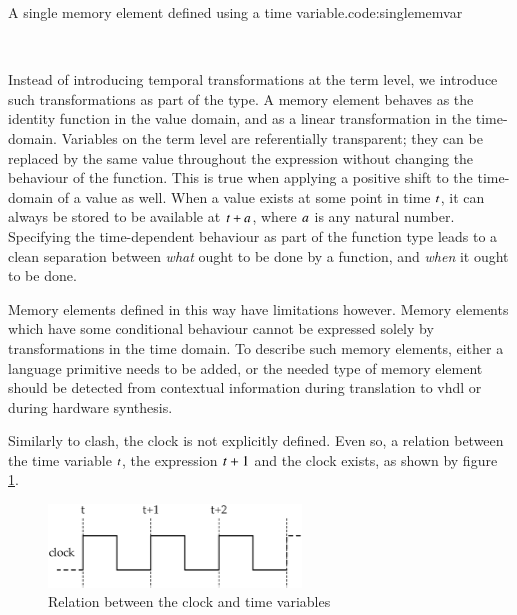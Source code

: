 \begin{texexptitled}{A single memory element defined using a time variable.}{code:singlememvar}\begin{hscode}\SaveRestoreHook
{}%
%
%
\>[3]{}\mathbin{::}\langle{}\rangle\to {}\langle{}\mathbin{+}\rangle{}\<[E]%
\\
\>[3]{}\;\mathrel{=}\<[E]%
\ColumnHook
\end{hscode}\resethooks
\end{texexptitled}

Instead of introducing temporal transformations at the term level, we introduce such transformations as part of the type. 
A memory element behaves as the identity function in the value domain, and as a linear transformation in the time-domain.
Variables on the term level are referentially transparent; they can be replaced by the same value throughout the expression without changing the behaviour of the function.
This is true when applying a positive shift to the time-domain of a value as well.
When a value exists at some point in time \ensuremath{\Varid{t}}, it can always be stored to be available at \ensuremath{\Varid{t}\mathbin{+}\Varid{a}}, where \ensuremath{\Varid{a}} is any natural number.
Specifying the time-dependent behaviour as part of the function type leads to a clean separation between \textit{what} ought to be done by a function, and \textit{when} it ought to be done.

Memory elements defined in this way have limitations however.
Memory elements which have some conditional behaviour cannot be expressed solely by transformations in the time domain.
To describe such memory elements, either a language primitive needs to be added, or the needed type of memory element should be detected from contextual information during translation to \gls{vhdl} or during hardware synthesis.

Similarly to \gls{clash}, the clock is not explicitly defined.
Even so, a relation between the time variable \ensuremath{\Varid{t}}, the expression \ensuremath{\Varid{t}\mathbin{+}\mathrm{1}} and the clock exists, as shown by figure \ref{fig:clock}.

\begin{figure}[H]
\begin{center}
\centering
\includegraphics[width=0.6\textwidth]{images/clock}
\end{center}
\caption{Relation between the clock and time variables} \label{fig:clock}
\end{figure}

